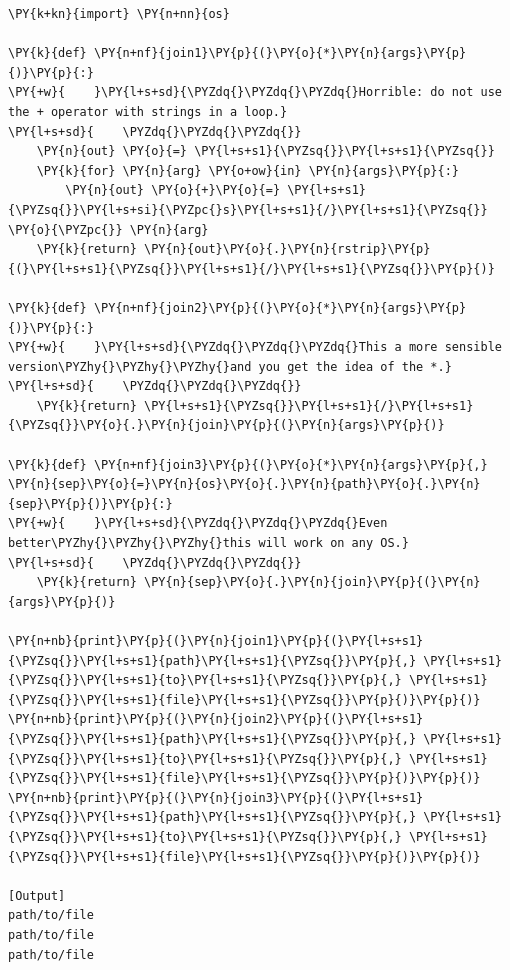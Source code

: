 \begin{Verbatim}[label=\makebox{\url{https://github.com/lucabaldini/cmepda/tree/master/slides/latex/snippets/func\_variadic2.py}},commandchars=\\\{\}]
\PY{k+kn}{import} \PY{n+nn}{os}

\PY{k}{def} \PY{n+nf}{join1}\PY{p}{(}\PY{o}{*}\PY{n}{args}\PY{p}{)}\PY{p}{:}
\PY{+w}{    }\PY{l+s+sd}{\PYZdq{}\PYZdq{}\PYZdq{}Horrible: do not use the + operator with strings in a loop.}
\PY{l+s+sd}{    \PYZdq{}\PYZdq{}\PYZdq{}}
    \PY{n}{out} \PY{o}{=} \PY{l+s+s1}{\PYZsq{}}\PY{l+s+s1}{\PYZsq{}}
    \PY{k}{for} \PY{n}{arg} \PY{o+ow}{in} \PY{n}{args}\PY{p}{:}
        \PY{n}{out} \PY{o}{+}\PY{o}{=} \PY{l+s+s1}{\PYZsq{}}\PY{l+s+si}{\PYZpc{}s}\PY{l+s+s1}{/}\PY{l+s+s1}{\PYZsq{}} \PY{o}{\PYZpc{}} \PY{n}{arg}
    \PY{k}{return} \PY{n}{out}\PY{o}{.}\PY{n}{rstrip}\PY{p}{(}\PY{l+s+s1}{\PYZsq{}}\PY{l+s+s1}{/}\PY{l+s+s1}{\PYZsq{}}\PY{p}{)}

\PY{k}{def} \PY{n+nf}{join2}\PY{p}{(}\PY{o}{*}\PY{n}{args}\PY{p}{)}\PY{p}{:}
\PY{+w}{    }\PY{l+s+sd}{\PYZdq{}\PYZdq{}\PYZdq{}This a more sensible version\PYZhy{}\PYZhy{}\PYZhy{}and you get the idea of the *.}
\PY{l+s+sd}{    \PYZdq{}\PYZdq{}\PYZdq{}}
    \PY{k}{return} \PY{l+s+s1}{\PYZsq{}}\PY{l+s+s1}{/}\PY{l+s+s1}{\PYZsq{}}\PY{o}{.}\PY{n}{join}\PY{p}{(}\PY{n}{args}\PY{p}{)}

\PY{k}{def} \PY{n+nf}{join3}\PY{p}{(}\PY{o}{*}\PY{n}{args}\PY{p}{,} \PY{n}{sep}\PY{o}{=}\PY{n}{os}\PY{o}{.}\PY{n}{path}\PY{o}{.}\PY{n}{sep}\PY{p}{)}\PY{p}{:}
\PY{+w}{    }\PY{l+s+sd}{\PYZdq{}\PYZdq{}\PYZdq{}Even better\PYZhy{}\PYZhy{}\PYZhy{}this will work on any OS.}
\PY{l+s+sd}{    \PYZdq{}\PYZdq{}\PYZdq{}}
    \PY{k}{return} \PY{n}{sep}\PY{o}{.}\PY{n}{join}\PY{p}{(}\PY{n}{args}\PY{p}{)}

\PY{n+nb}{print}\PY{p}{(}\PY{n}{join1}\PY{p}{(}\PY{l+s+s1}{\PYZsq{}}\PY{l+s+s1}{path}\PY{l+s+s1}{\PYZsq{}}\PY{p}{,} \PY{l+s+s1}{\PYZsq{}}\PY{l+s+s1}{to}\PY{l+s+s1}{\PYZsq{}}\PY{p}{,} \PY{l+s+s1}{\PYZsq{}}\PY{l+s+s1}{file}\PY{l+s+s1}{\PYZsq{}}\PY{p}{)}\PY{p}{)}
\PY{n+nb}{print}\PY{p}{(}\PY{n}{join2}\PY{p}{(}\PY{l+s+s1}{\PYZsq{}}\PY{l+s+s1}{path}\PY{l+s+s1}{\PYZsq{}}\PY{p}{,} \PY{l+s+s1}{\PYZsq{}}\PY{l+s+s1}{to}\PY{l+s+s1}{\PYZsq{}}\PY{p}{,} \PY{l+s+s1}{\PYZsq{}}\PY{l+s+s1}{file}\PY{l+s+s1}{\PYZsq{}}\PY{p}{)}\PY{p}{)}
\PY{n+nb}{print}\PY{p}{(}\PY{n}{join3}\PY{p}{(}\PY{l+s+s1}{\PYZsq{}}\PY{l+s+s1}{path}\PY{l+s+s1}{\PYZsq{}}\PY{p}{,} \PY{l+s+s1}{\PYZsq{}}\PY{l+s+s1}{to}\PY{l+s+s1}{\PYZsq{}}\PY{p}{,} \PY{l+s+s1}{\PYZsq{}}\PY{l+s+s1}{file}\PY{l+s+s1}{\PYZsq{}}\PY{p}{)}\PY{p}{)}

[Output]
path/to/file
path/to/file
path/to/file
\end{Verbatim}